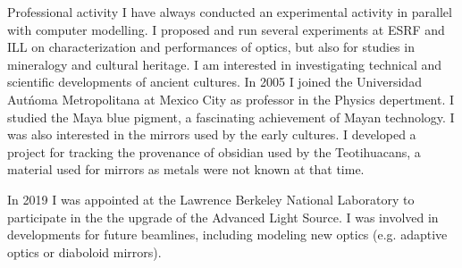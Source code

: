 \begin{rubric}{Professional activity}
I have always conducted an experimental activity in parallel with computer
modelling. I proposed and run several experiments at ESRF and ILL on characterization and performances of optics, but also for studies in mineralogy and cultural heritage. I am interested in investigating technical and scientific developments of ancient cultures. In 2005 I joined the Universidad Aut\'noma Metropolitana at Mexico City as professor in the Physics depertment. I studied the Maya blue pigment, a fascinating achievement of Mayan technology. 
I was also interested in the mirrors used by the early cultures. I developed a project for tracking the provenance of obsidian used by the Teotihuacans, a material used for mirrors as metals were not known at that time.

In 2019 I was appointed at the Lawrence Berkeley National Laboratory to participate in the the upgrade of the Advanced Light Source. I was involved in  developments for future beamlines, including modeling new optics (e.g. adaptive optics or diaboloid mirrors).





\end{rubric}
